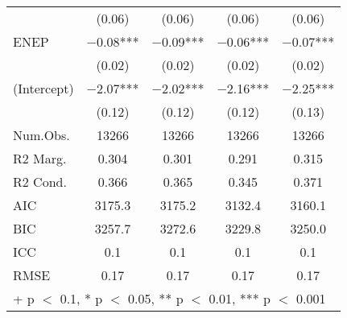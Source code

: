 \begin{table}
\begin{tabular}[t]{lcccc}
 & (\num{0.06}) & (\num{0.06}) & (\num{0.06}) & (\num{0.06})\\
ENEP & \num{-0.08}*** & \num{-0.09}*** & \num{-0.06}*** & \num{-0.07}***\\
 & (\num{0.02}) & (\num{0.02}) & (\num{0.02}) & (\num{0.02})\\
(Intercept) & \num{-2.07}*** & \num{-2.02}*** & \num{-2.16}*** & \num{-2.25}***\\
 & (\num{0.12}) & (\num{0.12}) & (\num{0.12}) & (\num{0.13})\\
\midrule
Num.Obs. & \num{13266} & \num{13266} & \num{13266} & \num{13266}\\
R2 Marg. & \num{0.304} & \num{0.301} & \num{0.291} & \num{0.315}\\
R2 Cond. & \num{0.366} & \num{0.365} & \num{0.345} & \num{0.371}\\
AIC & \num{3175.3} & \num{3175.2} & \num{3132.4} & \num{3160.1}\\
BIC & \num{3257.7} & \num{3272.6} & \num{3229.8} & \num{3250.0}\\
ICC & \num{0.1} & \num{0.1} & \num{0.1} & \num{0.1}\\
RMSE & \num{0.17} & \num{0.17} & \num{0.17} & \num{0.17}\\
\bottomrule
\multicolumn{5}{l}{\rule{0pt}{1em}+ p $<$ 0.1, * p $<$ 0.05, ** p $<$ 0.01, *** p $<$ 0.001}\\
\end{tabular}
\end{table}
